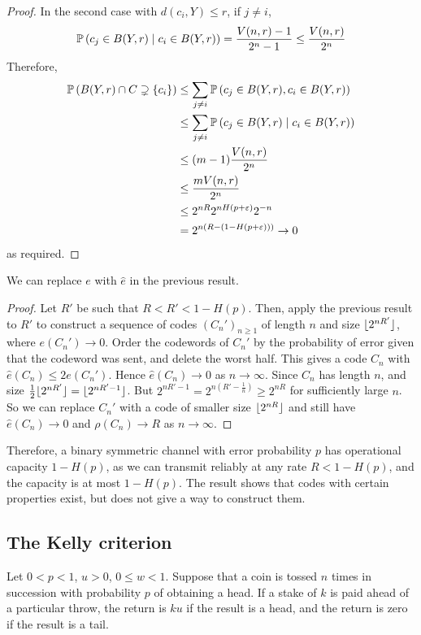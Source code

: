 \begin{proof}
    In the second case with \( d(c_i,Y) \leq r \), if \( j \neq i \),
    \[ \mathbb{P}\left({c_j \in B(Y,r) \mid c_i \in B(Y,r)}\right) = \frac{V(n,r) - 1}{2^n - 1} \leq \frac{V(n,r)}{2^n} \]
    Therefore,
    \begin{align*}
        \mathbb{P}\left({B(Y,r) \cap C \supsetneq \qty{c_i}}\right) &\leq \sum_{j \neq i} \mathbb{P}\left({c_j \in B(Y,r), c_i \in B(Y,r)}\right) \\
        &\leq \sum_{j \neq i} \mathbb{P}\left({c_j \in B(Y,r) \mid c_i \in B(Y,r)}\right) \\
        &\leq (m-1) \frac{V(n,r)}{2^n} \\
        &\leq \frac{mV(n,r)}{2^n} \\
        &\leq 2^{nR} 2^{nH(p+\varepsilon)} 2^{-n} \\
        &= 2^{n(R - (1 - H(p+\varepsilon)))} \to 0
    \end{align*}
    as required.
\end{proof}
\begin{proposition}
    We can replace \( e \) with \( \hat e \) in the previous result.
\end{proposition}
\begin{proof}
    Let \( R' \) be such that \( R < R' < 1 - H(p) \).
    Then, apply the previous result to \( R' \) to construct a sequence of codes \( (C_n')_{n \geq 1} \) of length \( n \) and size \( \lfloor2^{nR'}\rfloor \), where \( e(C_n') \to 0 \).
    Order the codewords of \( C_n' \) by the probability of error given that the codeword was sent, and delete the worst half.
    This gives a code \( C_n \) with \( \hat e(C_n) \leq 2 e(C_n') \).
    Hence \( \hat e(C_n) \to 0 \) as \( n \to \infty \).
    Since \( C_n \) has length \( n \), and size \( \frac{1}{2} \lfloor2^{nR'}\rfloor = \lfloor2^{nR' - 1}\rfloor \).
    But \( 2^{nR' - 1} = 2^{n(R' - \frac{1}{n})} \geq 2^{nR} \) for sufficiently large \( n \).
    So we can replace \( C_n' \) with a code of smaller size \( \lfloor2^{nR}\rfloor \) and still have \( \hat e(C_n) \to 0 \) and \( \rho(C_n) \to R \) as \( n \to \infty \).
\end{proof}
Therefore, a binary symmetric channel with error probability \( p \) has operational capacity \( 1 - H(p) \), as we can transmit reliably at any rate \( R < 1 - H(p) \), and the capacity is at most \( 1 - H(p) \).
The result shows that codes with certain properties exist, but does not give a way to construct them.

\subsection{The Kelly criterion}
Let \( 0 < p < 1 \), \( u > 0 \), \( 0 \leq w < 1 \).
Suppose that a coin is tossed \( n \) times in succession with probability \( p \) of obtaining a head.
If a stake of \( k \) is paid ahead of a particular throw, the return is \( ku \) if the result is a head, and the return is zero if the result is a tail.

